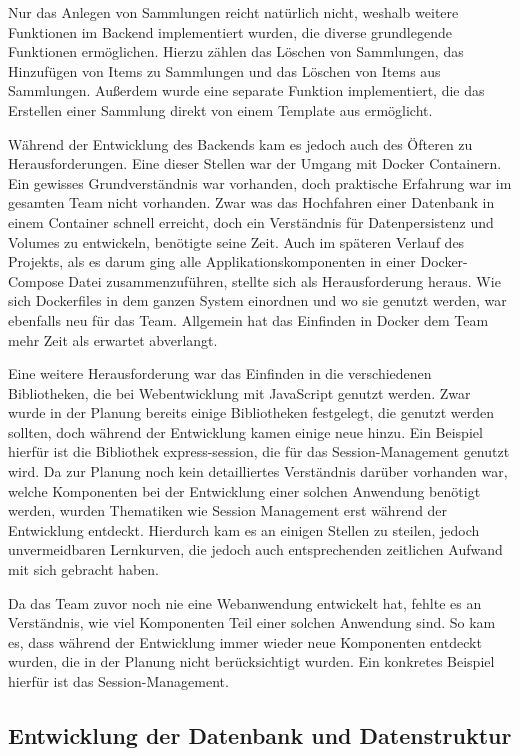 Nur das Anlegen von Sammlungen reicht natürlich nicht, weshalb weitere Funktionen im Backend implementiert wurden, die diverse grundlegende Funktionen ermöglichen.
Hierzu zählen das Löschen von Sammlungen, das Hinzufügen von Items zu Sammlungen und das Löschen von Items aus Sammlungen.
Außerdem wurde eine separate Funktion implementiert, die das Erstellen einer Sammlung direkt von einem Template aus ermöglicht.


Während der Entwicklung des Backends kam es jedoch auch des Öfteren zu Herausforderungen.
Eine dieser Stellen war der Umgang mit Docker Containern.
Ein gewisses Grundverständnis war vorhanden, doch praktische Erfahrung war im gesamten Team nicht vorhanden.
Zwar was das Hochfahren einer Datenbank in einem Container schnell erreicht, doch ein Verständnis für Datenpersistenz und Volumes zu entwickeln, benötigte seine Zeit.
Auch im späteren Verlauf des Projekts, als es darum ging alle Applikationskomponenten in einer Docker-Compose Datei zusammenzuführen, stellte sich als Herausforderung heraus.
Wie sich Dockerfiles in dem ganzen System einordnen und wo sie genutzt werden, war ebenfalls neu für das Team.
Allgemein hat das Einfinden in Docker dem Team mehr Zeit als erwartet abverlangt.

Eine weitere Herausforderung war das Einfinden in die verschiedenen Bibliotheken, die bei Webentwicklung mit JavaScript genutzt werden.
Zwar wurde in der Planung bereits einige Bibliotheken festgelegt, die genutzt werden sollten, doch während der Entwicklung kamen einige neue hinzu.
Ein Beispiel hierfür ist die Bibliothek express-session, die für das Session-Management genutzt wird.
Da zur Planung noch kein detailliertes Verständnis darüber vorhanden war, welche Komponenten bei der Entwicklung einer solchen Anwendung benötigt werden, wurden Thematiken wie Session Management erst während der Entwicklung entdeckt.
Hierdurch kam es an einigen Stellen zu steilen, jedoch unvermeidbaren Lernkurven, die jedoch auch entsprechenden zeitlichen Aufwand mit sich gebracht haben.

Da das Team zuvor noch nie eine Webanwendung entwickelt hat, fehlte es an Verständnis, wie viel Komponenten Teil einer solchen Anwendung sind.
So kam es, dass während der Entwicklung immer wieder neue Komponenten entdeckt wurden, die in der Planung nicht berücksichtigt wurden.
Ein konkretes Beispiel hierfür ist das Session-Management.

\subsection{Entwicklung der Datenbank und Datenstruktur}\label{subsec:entwicklung-der-datenbank-und-datenstruktur}

